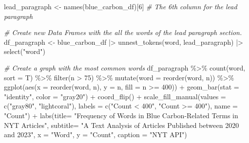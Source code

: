 \documentclass[
]{article}
\newenvironment{Shaded}{\begin{snugshade}}{\end{snugshade}}
\newcommand{\AttributeTok}[1]{\textcolor[rgb]{0.77,0.63,0.00}{#1}}
\newcommand{\CommentTok}[1]{\textcolor[rgb]{0.56,0.35,0.01}{\textit{#1}}}
\newcommand{\DecValTok}[1]{\textcolor[rgb]{0.00,0.00,0.81}{#1}}
\newcommand{\FunctionTok}[1]{\textcolor[rgb]{0.00,0.00,0.00}{#1}}
\newcommand{\NormalTok}[1]{#1}
\newcommand{\OtherTok}[1]{\textcolor[rgb]{0.56,0.35,0.01}{#1}}
\newcommand{\SpecialCharTok}[1]{\textcolor[rgb]{0.00,0.00,0.00}{#1}}
\newcommand{\StringTok}[1]{\textcolor[rgb]{0.31,0.60,0.02}{#1}}
\begin{document}
\begin{Shaded}
\begin{Highlighting}[]
\NormalTok{lead\_paragraph }\OtherTok{\textless{}{-}} \FunctionTok{names}\NormalTok{(blue\_carbon\_df)[}\DecValTok{6}\NormalTok{] }\CommentTok{\# The 6th column for the lead paragraph}

\CommentTok{\# Create new Data Frames with the all the words of the lead paragraph section.}
\NormalTok{df\_paragraph }\OtherTok{\textless{}{-}}\NormalTok{ blue\_carbon\_df }\SpecialCharTok{|\textgreater{}}
  \FunctionTok{unnest\_tokens}\NormalTok{(word, lead\_paragraph) }\SpecialCharTok{|\textgreater{}} 
  \FunctionTok{select}\NormalTok{(}\StringTok{"word"}\NormalTok{)}

\CommentTok{\# Create a graph with the most common words}
\NormalTok{df\_paragraph }\SpecialCharTok{\%\textgreater{}\%}
  \FunctionTok{count}\NormalTok{(word, }\AttributeTok{sort =}\NormalTok{ T) }\SpecialCharTok{\%\textgreater{}\%}
  \FunctionTok{filter}\NormalTok{(n }\SpecialCharTok{\textgreater{}} \DecValTok{75}\NormalTok{) }\SpecialCharTok{\%\textgreater{}\%}
  \FunctionTok{mutate}\NormalTok{(}\AttributeTok{word =} \FunctionTok{reorder}\NormalTok{(word, n)) }\SpecialCharTok{\%\textgreater{}\%}
  \FunctionTok{ggplot}\NormalTok{(}\FunctionTok{aes}\NormalTok{(}\AttributeTok{x =} \FunctionTok{reorder}\NormalTok{(word, n), }\AttributeTok{y =}\NormalTok{ n, }\AttributeTok{fill =}\NormalTok{ n }\SpecialCharTok{\textgreater{}=} \DecValTok{400}\NormalTok{)) }\SpecialCharTok{+}
  \FunctionTok{geom\_bar}\NormalTok{(}\AttributeTok{stat =} \StringTok{"identity"}\NormalTok{, }\AttributeTok{color =} \StringTok{"gray20"}\NormalTok{) }\SpecialCharTok{+}
  \FunctionTok{coord\_flip}\NormalTok{() }\SpecialCharTok{+}
  \FunctionTok{scale\_fill\_manual}\NormalTok{(}\AttributeTok{values =} \FunctionTok{c}\NormalTok{(}\StringTok{"gray80"}\NormalTok{, }\StringTok{"lightcoral"}\NormalTok{), }
                    \AttributeTok{labels =} \FunctionTok{c}\NormalTok{(}\StringTok{"Count \textless{} 400"}\NormalTok{, }\StringTok{"Count \textgreater{}= 400"}\NormalTok{), }
                    \AttributeTok{name =} \StringTok{"Count"}\NormalTok{) }\SpecialCharTok{+}
  \FunctionTok{labs}\NormalTok{(}\AttributeTok{title=} \StringTok{"Frequency of Words in Blue Carbon{-}Related Terms in NYT Articles"}\NormalTok{,}
       \AttributeTok{subtitle=} \StringTok{"A Text Analysis of Articles Published between 2020 and 2023"}\NormalTok{,}
       \AttributeTok{x =} \StringTok{"Word"}\NormalTok{,}
       \AttributeTok{y =} \StringTok{"Count"}\NormalTok{,}
       \AttributeTok{caption =} \StringTok{"NYT API"}\NormalTok{) }
\end{Highlighting}
\end{Shaded}
\end{document}
